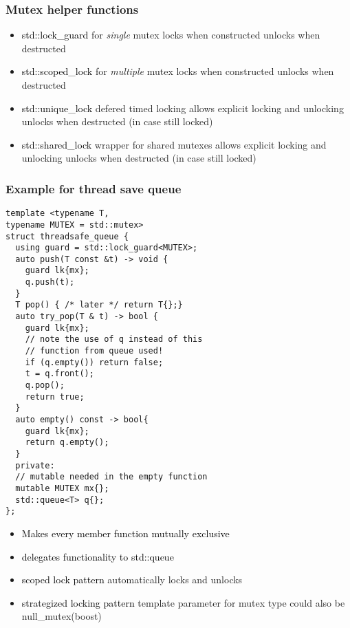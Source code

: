 \documentclass[main.tex,fontsize=8pt,paper=a4,paper=portrait,DIV=calc,]{scrartcl}
\begin{document}
\subsubsection{Mutex helper functions}
\begin{itemize}
\item \textcolor{black}{std::lock\_guard}\newline
  for \emph{single} mutex\newline
  locks when constructed\newline
  unlocks when destructed
\item \textcolor{black}{std::scoped\_lock}\newline
    for \emph{multiple} mutex\newline
  locks when constructed\newline
  unlocks when destructed
\item \textcolor{black}{std::unique\_lock}\newline
  defered timed locking\newline
  allows explicit locking and unlocking\newline
  unlocks when destructed (in case still locked)
\item \textcolor{black}{std::shared\_lock}\newline
  wrapper for shared mutexes\newline
  allows explicit locking and unlocking\newline
  unlocks when destructed (in case still locked)
\end{itemize} 

\subsubsection{Example for thread save queue}
\begin{lstlisting}
template <typename T,
typename MUTEX = std::mutex>
struct threadsafe_queue {
  using guard = std::lock_guard<MUTEX>;
  auto push(T const &t) -> void {
    guard lk{mx};
    q.push(t);
  }
  T pop() { /* later */ return T{};}
  auto try_pop(T & t) -> bool {
    guard lk{mx};
    // note the use of q instead of this
    // function from queue used!
    if (q.empty()) return false;
    t = q.front();
    q.pop();
    return true;
  }
  auto empty() const -> bool{
    guard lk{mx};
    return q.empty();
  }
  private:
  // mutable needed in the empty function
  mutable MUTEX mx{};
  std::queue<T> q{};
};
\end{lstlisting}
\begin{itemize}
\item \textcolor{black}{Makes every member function mutually exclusive}
\item \textcolor{black}{delegates functionality to std::queue}
\item \textcolor{black}{scoped lock pattern}\newline
  automatically locks and unlocks
\item \textcolor{black}{strategized locking pattern}\newline
  template parameter for mutex type\newline
  could also be null\_mutex(boost)
\end{itemize} 
\end{document}

